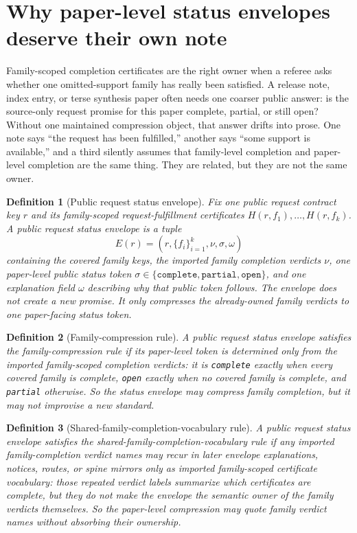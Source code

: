\documentclass[11pt]{article}
\newtheorem{definition}{Definition}
\begin{document}
\section{Why paper-level status envelopes deserve their own note}
Family-scoped completion certificates are the right owner when a referee asks whether one omitted-support family has really been satisfied.
A release note, index entry, or terse synthesis paper often needs one coarser public answer: is the source-only request promise for this paper complete, partial, or still open?
Without one maintained compression object, that answer drifts into prose.
One note says ``the request has been fulfilled,'' another says ``some support is available,'' and a third silently assumes that family-level completion and paper-level completion are the same thing.
They are related, but they are not the same owner.

\begin{definition}[Public request status envelope]
Fix one public request contract key $r$ and its family-scoped request-fulfillment certificates $H(r,f_1),\dots,H(r,f_k)$.
A \emph{public request status envelope} is a tuple
\[
E(r)=(r,\{f_i\}_{i=1}^k,\nu,\sigma,\omega)
\]
containing the covered family keys, the imported family completion verdicts $\nu$, one paper-level public status token $\sigma\in\{\texttt{complete},\texttt{partial},\texttt{open}\}$, and one explanation field $\omega$ describing why that public token follows.
The envelope does not create a new promise.
It only compresses the already-owned family verdicts to one paper-facing status token.
\end{definition}

\begin{definition}[Family-compression rule]
A public request status envelope satisfies the \emph{family-compression rule} if its paper-level token is determined only from the imported family-scoped completion verdicts: it is \texttt{complete} exactly when every covered family is complete, \texttt{open} exactly when no covered family is complete, and \texttt{partial} otherwise.
So the status envelope may compress family completion, but it may not improvise a new standard.
\end{definition}

\begin{definition}[Shared-family-completion-vocabulary rule]
A public request status envelope satisfies the \emph{shared-family-completion-vocabulary rule} if any imported family-completion verdict names may recur in later envelope explanations, notices, routes, or spine mirrors only as imported family-scoped certificate vocabulary: those repeated verdict labels summarize which certificates are complete, but they do not make the envelope the semantic owner of the family verdicts themselves.
So the paper-level compression may quote family verdict names without absorbing their ownership.
\end{definition}
\end{document}

